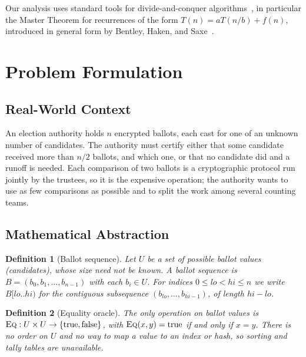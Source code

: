 \documentclass[conference]{IEEEtran}
\newtheorem{definition}{Definition}
\newcommand{\Eq}{\textsc{Eq}}
\begin{document}
Our analysis uses standard tools for divide-and-conquer
algorithms~\cite{cormen2009introduction}, in particular the Master Theorem for
recurrences of the form $T(n) = aT(n/b) + f(n)$, introduced in general form by
Bentley, Haken, and Saxe~\cite{bentley1980general}.

\section{Problem Formulation}\label{sec:problem}

\subsection{Real-World Context}

An election authority holds $n$ encrypted ballots, each cast for one of an
unknown number of candidates. The authority must certify either that some
candidate received more than $n/2$ ballots, and which one, or that no candidate
did and a runoff is needed. Each comparison of two ballots is a cryptographic
protocol run jointly by the trustees, so it is the expensive operation; the
authority wants to use as few comparisons as possible and to split the work
among several counting teams.

\subsection{Mathematical Abstraction}

\begin{definition}[Ballot sequence]
Let $U$ be a set of possible ballot values (candidates), whose size need not
be known. A ballot sequence is $B = (b_0, b_1, \ldots, b_{n-1})$ with each
$b_i \in U$. For indices $0 \le lo < hi \le n$ we write $B[lo..hi)$ for the
contiguous subsequence $(b_{lo}, \ldots, b_{hi-1})$, of length $hi - lo$.
\end{definition}

\begin{definition}[Equality oracle]
The only operation on ballot values is
$\Eq : U \times U \to \{\text{true}, \text{false}\}$, with
$\Eq(x, y) = \text{true}$ if and only if $x = y$. There is no order on $U$ and
no way to map a value to an index or hash, so sorting and tally tables are
unavailable.
\end{definition}
\end{document}
